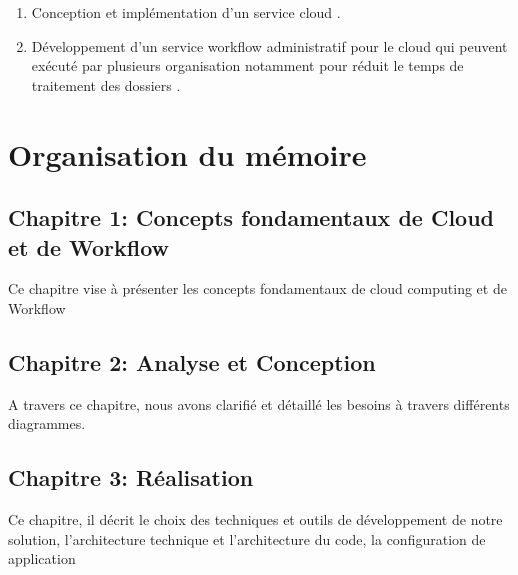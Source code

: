 \begin{enumerate}
\item Conception et implémentation d'un service cloud .
 
\item Développement d'un service workflow administratif  pour le cloud qui peuvent exécuté par plusieurs  organisation notamment pour réduit le temps de traitement des dossiers .  
\end{enumerate}


\section*{Organisation du mémoire}


\subsection*{Chapitre 1: Concepts fondamentaux de Cloud et de Workflow} 

Ce chapitre vise à présenter les concepts fondamentaux de cloud computing  et de Workflow 
\subsection*{Chapitre 2: Analyse et Conception} 
A travers ce chapitre, nous avons clarifié et détaillé les besoins à travers différents diagrammes. 
\subsection*{Chapitre 3: Réalisation}


Ce chapitre, il décrit le choix des techniques et outils de développement de notre solution, l’architecture technique et l’architecture du code, la configuration de application 
